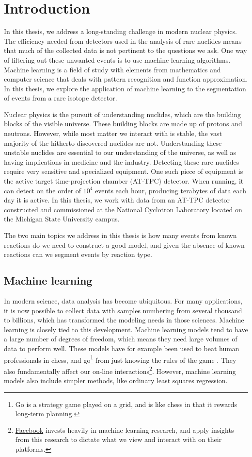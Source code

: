 \chapter{Introduction}\label{ch:introduction}


In this thesis, we address a long-standing challenge in modern nuclear physics. 
The efficiency needed from detectors used in the analysis of rare nuclides means that much of the collected data is not pertinent to the questions we ask. One way of filtering out these unwanted events is to use machine learning algorithms. Machine learning is a field of study with elements from mathematics and computer science that deals with pattern recognition and function approximation. In this thesis, we explore the application of machine learning to the segmentation of events from a rare isotope detector.

Nuclear physics is the pursuit of understanding nuclides, which are the building blocks of the visible universe. These building blocks are made up of protons and neutrons. However, while most matter we interact with is stable, the vast majority of the hitherto discovered nuclides are not. Understanding these unstable nuclides are essential to our understanding of the universe, as well as having implications in medicine and the industry. Detecting these rare nuclides require very sensitive and specialized equipment. One such piece of equipment is the active target time-projection chamber (AT-TPC) detector. When running, it can detect on the order of $10^4$ events each hour, producing terabytes of data each day it is active. In this thesis, we work with data from an AT-TPC detector constructed and commissioned at the National Cyclotron Laboratory located on the Michigan State University campus. 

The two main topics we address in this thesis is how many events from known reactions do we need to construct a good model, and given the absence of known reactions can we segment events by reaction type. 
\section{Machine learning}

In modern science, data analysis has become ubiquitous. For many applications, it is now possible to collect data with samples numbering from several thousand to billions, which has transformed the modeling needs in those sciences. Machine learning is closely tied to this development. Machine learning models tend to have a large number of degrees of freedom, which means they need large volumes of data to perform well. These models have for example been used to beat human professionals in chess, and go\footnote{Go is a strategy game played on a grid, and is like chess in that it rewards long-term planning.} from just knowing the rules of the game \cite{Silver2017}. They also fundamentally affect our on-line interactions\footnote{\href{https://research.fb.com/category/machine-learning/}{Facebook} invests heavily in machine learning research, and apply insights from this research to dictate what we view and interact with on their platforms.}. However, machine learning models also include simpler methods, like ordinary least squares regression. 

